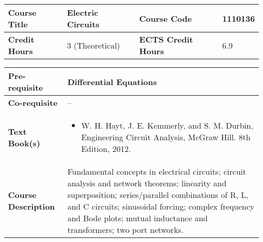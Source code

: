 \documentclass[12pt]{article}
\begin{document}
\begin{minipage}{\textwidth}
\begin{tabularx}{\textwidth}{|l|X|l|X|}
\hline
\textbf{Course Title}       & Electric Circuits  & \textbf{Course Code}       &  1110136 \\ \hline
\textbf{Credit Hours}       &  3 (Theoretical) & \textbf{ECTS Credit Hours}       &  6.9 \\ \hline
\end{tabularx}

\begin{tabularx}{\textwidth}{|l|X|}
\hline
\textbf{Pre-requisite}      &  Differential Equations \\ \hline
\textbf{Co-requisite}       &  -- \\ \hline
\textbf{Text Book(s)}      & \begin{minipage}{.70\textwidth}
					\begin{itemize} \itemsep-0.4em
						\vspace{3mm}
						\item W. H. Hayt, J. E. Kemmerly, and S. M. Durbin, Engineering Circuit Analysis, McGraw Hill. 8th Edition, 2012.
						\vspace{3mm}
					\end{itemize}
				\end{minipage}  \\ \hline
\textbf{Course Description} & \begin{minipage}{.70\textwidth}
					\vspace{3mm}
					Fundamental concepts in electrical circuits; circuit analysis and network theorems; linearity and superposition; series/parallel combinations of R, L, and C circuits; sinusoidal forcing; complex frequency and Bode plots; mutual inductance and transformers; two port networks.

					\vspace{3mm}
					\end{minipage} \\ \hline
\end{tabularx}
\end{minipage}


\bigskip
\bigskip
\end{document}
